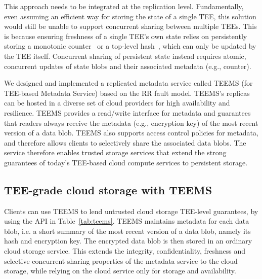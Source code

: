 This approach needs to be integrated at the replication
level. Fundamentally, even assuming an efficient way for
storing the state of a single \ac{TEE}, this solution would still be
unable to support concurrent sharing between multiple \acp{TEE}. This
is because ensuring freshness of a single \ac{TEE}'s own state relies
on persistently storing a monotonic counter~\cite{ariadne,rote,ice}
or a top-level hash~\cite{memoir}, which can only be updated by
the \ac{TEE} itself.  Concurrent sharing of persistent state instead
requires atomic, concurrent updates of state blobs and their
associated metadata (e.g., counter).

We designed and implemented a replicated metadata service called
\ac{TEEMS} (for \ac{TEE}-based Metadata Service) based on the
\ac{RR} fault model. \ac{TEEMS}'s replicas can be hosted in a
diverse set of cloud providers for high availability and
resilience.
%
\ac{TEEMS} provides a read/write interface for metadata and guarantees that
readers always receive the metadata (e.g., encryption key) of the most
recent version of a data blob.  \ac{TEEMS} also supports access control
policies for metadata, and therefore allows clients to selectively
share the associated data blobs.  The service therefore enables
trusted storage services that extend the strong guarantees of today's
\ac{TEE}-based cloud compute services to persistent storage.

\subsection{\ac{TEE}-grade cloud storage with \ac{TEEMS}}

Clients can use \ac{TEEMS} to lend untrusted cloud storage \ac{TEE}-level
guarantees, by using the API in Table~\ref{tab:teems}.
\ac{TEEMS} maintains metadata for each data blob, i.e. a short summary of
the most recent version of a data blob, namely its hash and encryption
key. The encrypted data blob is then stored in an ordinary cloud
storage service. This extends the integrity, confidentiality,
freshness and selective concurrent sharing properties of the
metadata service to the cloud storage, while relying on the cloud
service only for storage and availability.

